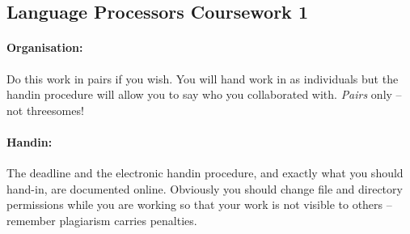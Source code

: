 \documentclass[11pt]{article}
\begin{document}
\subsection*{Language Processors Coursework 1}

\paragraph{Organisation:}
Do this work in pairs if you wish. You will hand
work in as individuals but the handin procedure will allow 
you to say who you collaborated with. 
\emph{Pairs} only -- not threesomes!

\paragraph{Handin:} 
The deadline and the electronic handin procedure, and exactly what you should 
hand-in, are documented online.
Obviously you should change file and directory permissions while you 
are working so that your work is not visible to others -- 
remember plagiarism carries penalties.
\end{document}
